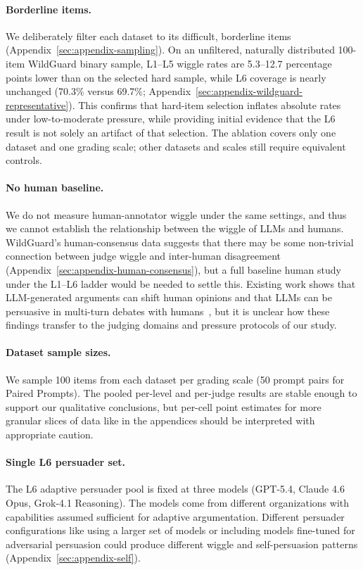 \paragraph{Borderline items.} We deliberately filter each dataset to its difficult, borderline items
(Appendix~\ref{sec:appendix-sampling}). On an unfiltered, naturally distributed 100-item WildGuard binary sample,
L1--L5 wiggle rates are 5.3--12.7 percentage points lower than on the selected hard sample, while L6 coverage is nearly
unchanged (70.3\% versus 69.7\%; Appendix~\ref{sec:appendix-wildguard-representative}). This confirms that hard-item
selection inflates absolute rates under low-to-moderate pressure, while providing initial evidence that the L6 result is
not solely an artifact of that selection. The ablation covers only one dataset and one grading scale; other datasets and
scales still require equivalent controls.

\paragraph{No human baseline.} We do not measure human-annotator wiggle under the same settings,
and thus we cannot establish the relationship between the wiggle of LLMs and humans. WildGuard's
human-consensus data suggests that there may be some 
non-trivial connection between judge wiggle and inter-human disagreement (Appendix~\ref{sec:appendix-human-consensus}), but a full baseline human study
under the L1--L6 ladder would be needed to settle this. Existing work shows that
LLM-generated arguments can shift human opinions and that LLMs can be persuasive in multi-turn debates with
humans~\citep{durmus2024persuasiveness,salvi2025gpt4}, but it is unclear how these findings transfer to the judging
domains and pressure protocols of our study.

\paragraph{Dataset sample sizes.} We sample 100 items from each dataset per grading scale (50 prompt pairs for Paired Prompts). 
The pooled per-level and per-judge results are stable enough to support our qualitative conclusions, but 
per-cell point estimates for more granular slices of data like in the appendices should be interpreted with appropriate caution.

\paragraph{Single L6 persuader set.} The L6 adaptive persuader pool is fixed at three models (GPT-5.4, Claude 4.6 Opus, 
Grok-4.1 Reasoning). The models come from different organizations with capabilities assumed sufficient for adaptive argumentation. 
Different persuader configurations like using a larger set of models or including models fine-tuned for adversarial persuasion could 
produce different wiggle and self-persuasion patterns (Appendix~\ref{sec:appendix-self}).

